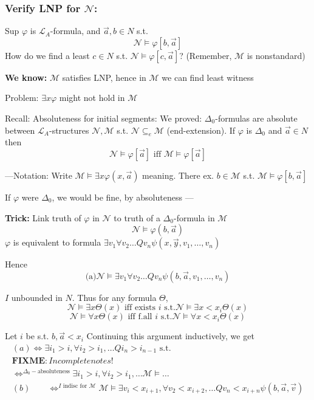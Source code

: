 \documentclass[12pt]{article}
\newcommand{\fixme}{\\ \textbf{FIXME}: Incomplete notes!}
\begin{document}
\subsubsection*{Verify LNP for $\mathcal{N}$:}
Sup $\varphi$ is $\mathcal{L}_A$-formula, and $\vec{a}, b \in N$ s.t.
\[
\mathcal{N} \models \varphi[b, \vec{a}]
\]
How do we find a least $c \in N$ s.t. $\mathcal{N} \models \varphi[c, \vec{a}]$?
(Remember, $\mathcal{M}$ is nonstandard)

\textbf{We know:}
$\mathcal{M}$ satisfies LNP, hence in $\mathcal{M}$ we can find least witness

Problem: $\exists x \varphi$ might not hold in $\mathcal{M}$

Recall: Absoluteness for initial segments:
%
We proved:
$\Delta_0$-formulas are absolute between $\mathcal{L}_A$-structures $\mathcal{N}, \mathcal{M}$ s.t. $\mathcal{N} \subseteq_e \mathcal{M}$ (end-extension).
%
If $\varphi$ is $\Delta_0$ and $\vec{a} \in N$ then
\[
\mathcal{N} \models \varphi[\vec{a}] \text{ iff } \mathcal{M} \models \varphi[\vec{a}]
\]

---Notation:
Write $\mathcal{M} \models \exists x \varphi(x, \vec{a})$
meaning. There ex. $b \in \mathcal{M}$ s.t. $\mathcal{M} \models \varphi[b, \vec{a}]$

If $\varphi$ were $\Delta_0$, we would be fine, by absoluteness
---

\textbf{Trick:} Link truth of $\varphi$ in $\mathcal{N}$ to truth of a
$\Delta_0$-formula in $\mathcal{M}$
\[
\mathcal{N} \models \varphi(b, \vec{a})
\]
$\varphi$ is equivalent to formula $\exists v_1 \forall v_2 \dots Q v_n
\psi(x, \vec{y}, v_1, \dots, v_n)$

Hence
\[
\text{(a)} \mathcal{N} \models \exists v_1 \forall v_2 \dots Q v_n
\psi(b, \vec{a}, v_1, \dots, v_n)
\]

$I$ unbounded in $N$.
Thus for any formula $\Theta$,
\[
\mathcal{N} \models \exists x \Theta(x) \text{ iff exists $i$ s.t.}
\mathcal{N} \models \exists x < x_i \Theta(x)
\]
\[
\mathcal{N} \models \forall x \Theta(x) \text{ iff f.all $i$ s.t.}
\mathcal{N} \models \forall x < x_i \Theta(x)
\]


Let $i$ be s.t. $b, \vec{a} < x_i$
Continuing this argument inductively,
we get
\begin{align*}
(a) \Leftrightarrow \exists i_1 > i, \forall i_2 > i_1, \dots Q i_n > i_{n-1}
\text{ s.t. }
\fixme
  \\
  \Leftrightarrow^{\Delta_0-\text{absoluteness}} \exists i_1 > i, \forall i_2 > i_1, \dots
  \mathcal{M} \models \dots \\
%
(b) \qquad \Leftrightarrow^{I \text{ indisc for } \mathcal{M}}
\mathcal{M} \models
\exists v_i < x_{i+1}, \forall v_2 < x_{i+2}, \dots Q v_n < x_{i+n}
\psi(b, \vec{a}, \vec{v})
\end{align*}
\end{document}

